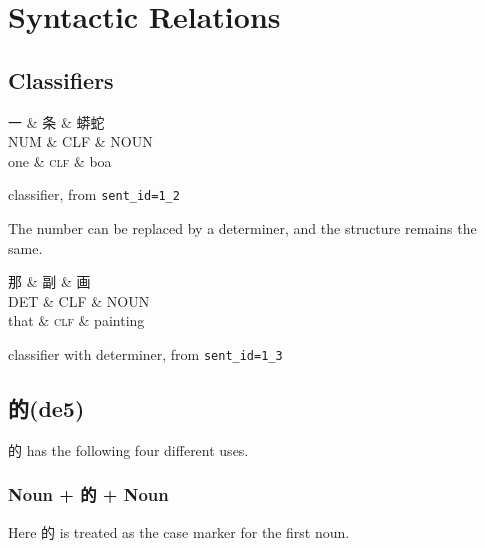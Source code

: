 \documentclass[UTF8,oneside]{book}
\begin{document}
\chapter{Syntactic Relations}

\section{Classifiers}

\begin{tree}[h]
\centering
\begin{dependency}[theme=simple]
\begin{deptext}[column sep=.5cm, row sep=.5ex]
一  \& 条  \& 蟒蛇 \\
NUM \& CLF \& NOUN \\
one \& \textsc{clf} \& boa \\
\end{deptext}
\end{dependency}
\caption{classifier, from \texttt{sent\_id=1\_2}}
\end{tree}

The number can be replaced by a determiner, and the structure remains the same. 


\begin{tree}[h]
\centering
\begin{dependency}[theme=simple]
\begin{deptext}[column sep=.5cm, row sep=.5ex]
那  \& 副  \& 画 \\
DET \& CLF \& NOUN \\
that \& \textsc{clf} \& painting \\
\end{deptext}
\end{dependency}
\caption{classifier with determiner, from \texttt{sent\_id=1\_3}}
\end{tree}

\newpage
\section{的(de5)} 

的 has the following four different uses.

\subsection{Noun + 的 + Noun}
Here 的 is treated as the case marker for the first noun. 
\end{document}
